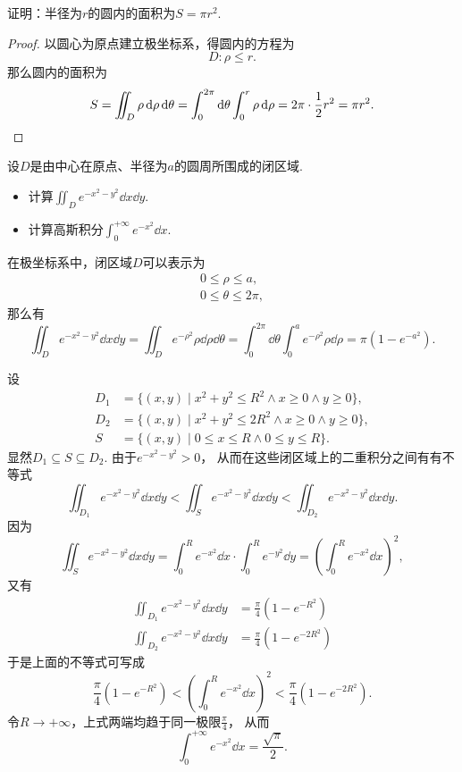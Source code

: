 \begin{example}
证明：半径为\(r\)的圆内的面积为\(S = \pi r^2\).
\begin{proof}
以圆心为原点建立极坐标系，得圆内的方程为\[
	D: \rho \leq r.
\]
那么圆内的面积为\[
	S = \iint_D \rho \dd{\rho} \dd{\theta}
	= \int_0^{2\pi} \dd{\theta} \int_0^r \rho \dd{\rho}
	= 2\pi \cdot \frac{1}{2} r^2
	= \pi r^2.
	\qedhere
\]
\end{proof}
\end{example}

\begin{example}\label{example:二重积分.利用二重积分计算高斯积分}
设\(D\)是由中心在原点、半径为\(a\)的圆周所围成的闭区域.
\begin{itemize}
	\item 计算\(\iint_D e^{-x^2-y^2} \dd{x} \dd{y}\).
	\item 计算高斯积分\(\int_0^{+\infty} e^{-x^2} \dd{x}\).
\end{itemize}
\begin{solution}
在极坐标系中，闭区域\(D\)可以表示为\begin{gather*}
	0 \leq \rho \leq a, \\
	0 \leq \theta \leq 2\pi,
\end{gather*}
那么有\[
	\iint_D e^{-x^2-y^2} \dd{x} \dd{y}
	= \iint_D e^{-\rho^2} \rho \dd{\rho} \dd{\theta}
	= \int_0^{2\pi} \dd{\theta} \int_0^a e^{-\rho^2} \rho \dd{\rho}
	= \pi(1-e^{-a^2}).
\]

设\begin{align*}
	D_1 &= \{ (x,y) \mid x^2+y^2 \leq R^2 \land x \geq 0 \land y \geq 0 \}, \\
	D_2 &= \{ (x,y) \mid x^2+y^2 \leq 2 R^2 \land x \geq 0 \land y \geq 0 \}, \\
	S &= \{ (x,y) \mid 0 \leq x \leq R \land 0 \leq y \leq R \}.
\end{align*}
显然\(D_1 \subseteq S \subseteq D_2\).
由于\(e^{-x^2-y^2} > 0\)，
从而在这些闭区域上的二重积分之间有有不等式\[
	\iint_{D_1} e^{-x^2-y^2}\dd{x}\dd{y}
	< \iint_{S} e^{-x^2-y^2}\dd{x}\dd{y}
	< \iint_{D_2} e^{-x^2-y^2}\dd{x}\dd{y}.
\]
因为\[
	\iint_{S}{e^{-x^2-y^2}\dd{x}\dd{y}}
	= \int_0^R e^{-x^2}\dd{x} \cdot \int_0^R e^{-y^2} \dd{y}
	= \left( \int_0^R e^{-x^2} \dd{x} \right)^2,
\]
又有\begin{align*}
	\iint_{D_1}{e^{-x^2-y^2}\dd{x}\dd{y}}
	&= \frac{\pi}{4} (1 - e^{-R^2}) \\
	\iint_{D_2}{e^{-x^2-y^2}\dd{x}\dd{y}}
	&= \frac{\pi}{4} (1 - e^{-2 R^2})
\end{align*}
于是上面的不等式可写成\[
	\frac{\pi}{4} (1 - e^{-R^2})
	< \left( \int_0^R e^{-x^2} \dd{x} \right)^2
	< \frac{\pi}{4} (1 - e^{-2 R^2}).
\]
令\(R \to +\infty\)，上式两端均趋于同一极限\(\frac{\pi}{4}\)，
从而\begin{equation*}
	\int_0^{+\infty} e^{-x^2} \dd{x} = \frac{\sqrt{\pi}}{2}.
\end{equation*}
\end{solution}
\end{example}

